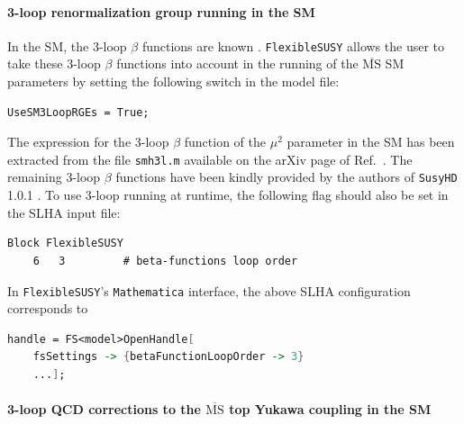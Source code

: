 \documentclass[final,3p,11pt,pdflatex]{elsarticle}
\makeatletter
\newcommand{\fs}{\texttt{FlexibleSUSY}\@\xspace}
\newcommand{\susyhd}{\texttt{SusyHD}\@\xspace}
\newcommand{\mathematica}{\texttt{Ma\-the\-ma\-ti\-ca}\xspace}
\newcommand{\code}[1]{\lstinline|#1|}  %
\newcommand{\ol}[1]{\overline{#1}}
\newcommand{\MSbar}{\ensuremath{\ol{\text{MS}}}\xspace}
\makeatother
\begin{document}
\paragraph{3-loop renormalization group running in the SM}

In the SM, the 3-loop $\beta$ functions are known
\cite{Mihaila:2012fm,Bednyakov:2012rb,Bednyakov:2012en,Chetyrkin:2012rz,Bednyakov:2013eba}.
\fs allows the user to take these 3-loop $\beta$ functions into
account in the running of the \MSbar SM parameters by
setting the following switch in the model file:
%
\begin{lstlisting}
UseSM3LoopRGEs = True;
\end{lstlisting}
%
The expression for the 3-loop $\beta$ function of the $\mu^2$ parameter in
the SM has been extracted from the file \code{smh3l.m} available on
the arXiv page of Ref.~\cite{Bednyakov:2013eba}.  The remaining 3-loop
$\beta$ functions have been kindly provided by the authors of \susyhd
1.0.1 \cite{Vega:2015fna}.  To use 3-loop running at runtime, the
following flag should also be set in the SLHA input file:
%
\begin{lstlisting}
Block FlexibleSUSY
    6   3         # beta-functions loop order
\end{lstlisting}
%
In \fs's \mathematica interface, the above SLHA configuration
corresponds to
%
\begin{lstlisting}[language=Mathematica]
handle = FS<model>OpenHandle[
    fsSettings -> {betaFunctionLoopOrder -> 3}
    ...];
\end{lstlisting}

\paragraph{3-loop QCD corrections to the \MSbar top Yukawa coupling in the SM}
\end{document}
